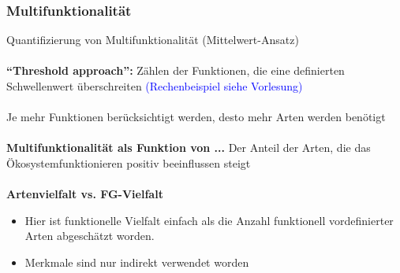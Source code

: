 \subsubsection{Multifunktionalität}
Quantifizierung von Multifunktionalität (Mittelwert-Ansatz)\\\\
\textbf{“Threshold approach”:} Zählen der Funktionen, die eine definierten Schwellenwert  überschreiten \textcolor{blue}{(Rechenbeispiel siehe Vorlesung)}\\\\
Je mehr Funktionen berücksichtigt werden, desto mehr Arten werden benötigt\\\\
\textbf{Multifunktionalität als Funktion von ...} Der Anteil der Arten, die das Ökosystemfunktionieren positiv beeinflussen steigt\\\\

\textbf{Artenvielfalt vs. FG-Vielfalt}
\begin{itemize}
	\item Hier ist funktionelle Vielfalt einfach als die Anzahl funktionell vordefinierter Arten abgeschätzt worden.
	\item Merkmale sind nur indirekt verwendet worden
\end{itemize}